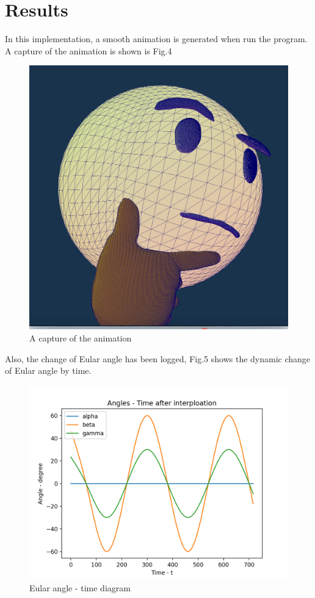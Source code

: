 \documentclass[acmtog]{acmart}
\begin{document}
\section{Results}
In this implementation, a smooth animation is generated when run the program. A capture of the animation is 
shown is Fig.4\\
\begin{figure}[H]
	\begin{center}
		\includegraphics[scale=0.17]{frame.png}
	\end{center}
	\caption{A capture of the animation}
\end{figure}
Also, the change of Eular angle has been logged, Fig.5 shows the dynamic change of Eular angle by time.\\
\begin{figure}[H]
	\begin{center}
		\includegraphics[scale=0.5]{angles.png}
	\end{center}
	\caption{Eular angle - time diagram}
\end{figure}
\end{document}
